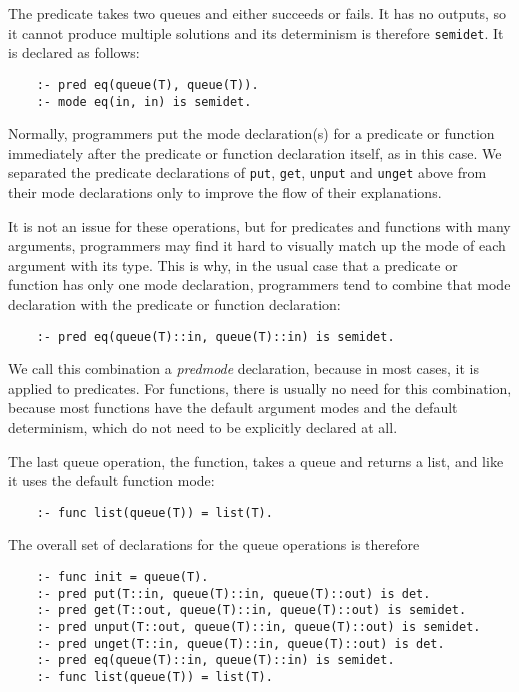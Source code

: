 The  predicate takes two queues and either succeeds or fails.
It has no outputs,
so it cannot produce multiple solutions
and its determinism is therefore \texttt{semidet}.
It is declared as follows:
\begin{verbatim}
    :- pred eq(queue(T), queue(T)).
    :- mode eq(in, in) is semidet.
\end{verbatim}

Normally, programmers put the mode declaration(s) for a predicate or function
immediately after the predicate or function declaration itself,
as in this case.
We separated the predicate declarations of
\texttt{put}, \texttt{get}, \texttt{unput} and \texttt{unget} above
from their mode declarations
only to improve the flow of their explanations.

It is not an issue for these operations,
but for predicates and functions with many arguments,
programmers may find it hard to visually match up
the mode of each argument with its type.
This is why,
in the usual case that a predicate or function has only one mode declaration,
programmers tend to combine that mode declaration
with the predicate or function declaration:

\begin{verbatim}
    :- pred eq(queue(T)::in, queue(T)::in) is semidet.
\end{verbatim}

We call this combination a \emph{predmode} declaration,
because in most cases, it is applied to predicates.
For functions, there is usually no need for this combination,
because most functions have
the default argument modes and the default determinism,
which do not need to be explicitly declared at all.

The last queue operation, the  function,
takes a queue and returns a list,
and like  it uses the default function mode:
\begin{verbatim}
    :- func list(queue(T)) = list(T).
\end{verbatim}

The overall set of declarations for the queue operations is therefore

\begin{verbatim}
    :- func init = queue(T).
    :- pred put(T::in, queue(T)::in, queue(T)::out) is det.
    :- pred get(T::out, queue(T)::in, queue(T)::out) is semidet.
    :- pred unput(T::out, queue(T)::in, queue(T)::out) is semidet.
    :- pred unget(T::in, queue(T)::in, queue(T)::out) is det.
    :- pred eq(queue(T)::in, queue(T)::in) is semidet.
    :- func list(queue(T)) = list(T).
\end{verbatim}


